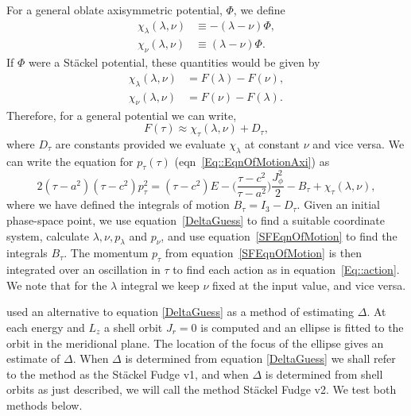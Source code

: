 \documentclass[useAMS,usenatbib,fleqn,a4paper]{mn2e}
\begin{document}
For a general oblate axisymmetric potential,
$\Phi$, we define
\begin{equation}
\begin{split}
\chi_\lambda(\lambda,\nu) &\equiv -(\lambda-\nu)\Phi,\\
\chi_\nu(\lambda,\nu) &\equiv (\lambda-\nu)\Phi.
\end{split}
\end{equation}
If $\Phi$ were a St\"ackel potential, these quantities would be given by
\begin{equation}
\begin{split}
\chi_\lambda(\lambda,\nu) &= F(\lambda)-F(\nu),\\
\chi_\nu(\lambda,\nu) &= F(\nu)-F(\lambda).
\end{split}
\end{equation}
Therefore, for a general potential we can write,
\begin{equation}
F(\tau) \approx \chi_\tau(\lambda,\nu)+D_\tau,
\end{equation}
where $D_\tau$ are constants provided we evaluate $\chi_\lambda$ at constant
$\nu$ and vice versa. We can write the equation for $p_\tau(\tau)$
(eqn~\ref{Eq::EqnOfMotionAxi}) as
\begin{equation}
2(\tau-a^2)(\tau-c^2)p_\tau^2 = (\tau-c^2)E-\Big(\frac{\tau-c^2}{\tau-a^2}\Big)\frac{J_\phi^2}{2}-B_\tau+\chi_\tau(\lambda,\nu),
\label{SFEqnOfMotion}
\end{equation}
where we have defined the integrals of motion $B_\tau = I_3-D_\tau$. Given an
initial phase-space point, we use equation~\eqref{DeltaGuess} to find a
suitable coordinate system, calculate $\lambda,\nu,p_\lambda$ and $p_\nu$,
and use equation~\eqref{SFEqnOfMotion} to find the integrals $B_\tau$. The
momentum $p_\tau$ from equation~\eqref{SFEqnOfMotion} is then integrated over
an oscillation in $\tau$ to find each action as in
equation~\eqref{Eq::action}. We note that for the $\lambda$ integral we keep
$\nu$ fixed at the input value, and vice versa.

\cite{Binney2014_ISO} used an alternative to equation \eqref{DeltaGuess} as a
method of estimating $\Delta$. At each energy and $L_z$ a shell orbit $J_r=0$
is computed and an ellipse is fitted to the orbit in the meridional plane.
The location of the focus of the ellipse gives an estimate of $\Delta$. When
$\Delta$ is determined from equation \eqref{DeltaGuess} we shall refer to the
method as the St\"ackel Fudge v1, and when $\Delta$ is determined from shell
orbits as just described, we will call the method St\"ackel Fudge v2. 
We test both methods below. 
\end{document}
